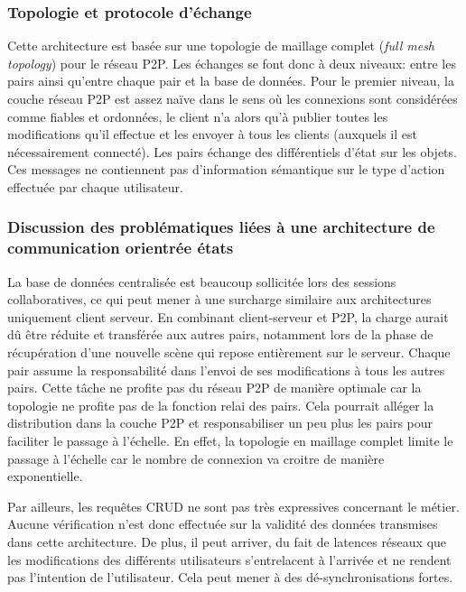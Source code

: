 \subsubsection{Topologie et protocole d'échange}
Cette architecture est basée sur une topologie de maillage complet (\textit{full 
mesh topology}) pour le réseau \gls{P2P}.
Les échanges se font donc à deux niveaux: entre les pairs ainsi qu'entre chaque 
pair et la base de données. Pour le premier niveau, la couche réseau \gls{P2P} est 
assez 
naïve dans le sens où les connexions sont considérées comme fiables et 
ordonnées, le client n'a alors qu'à publier toutes les modifications qu'il effectue et 
les envoyer à tous les clients (auxquels il est nécessairement connecté).
Les pairs échange des différentiels d'état sur les objets. Ces messages ne 
contiennent pas d'information sémantique sur le type d'action effectuée par chaque 
utilisateur. 

\subsubsection{Discussion des problématiques liées à une architecture de 
communication orientrée \og états\fg{}}

La base de données centralisée est beaucoup sollicitée lors des sessions 
collaboratives, ce qui peut mener à une surcharge similaire aux architectures 
uniquement client serveur. 
En combinant client-serveur et \gls{P2P}, la charge aurait dû être réduite et 
transférée aux autres pairs, notamment lors de la phase de récupération d'une 
nouvelle scène qui repose entièrement sur le serveur. 
Chaque pair assume la responsabilité dans l'envoi de ses modifications à tous les 
autres pairs. Cette tâche ne profite pas du réseau \gls{P2P} de manière optimale 
car la topologie ne profite pas de la fonction relai des pairs. Cela pourrait alléger  la 
distribution dans la couche \gls{P2P} et responsabiliser un peu plus les pairs pour 
faciliter le passage à l'échelle.
En effet, la topologie en maillage complet limite le passage à l'échelle car le 
nombre de connexion va croitre de manière exponentielle. 

Par ailleurs, les requêtes \gls{CRUD} ne sont pas très expressives concernant le 
métier. 
Aucune vérification n'est donc effectuée sur la validité des données transmises 
dans cette architecture. De plus, il peut arriver, du fait de latences réseaux que les 
modifications des différents utilisateurs s'entrelacent à l'arrivée et ne rendent pas 
l'intention de l'utilisateur. Cela peut mener à des dé-synchronisations fortes.

